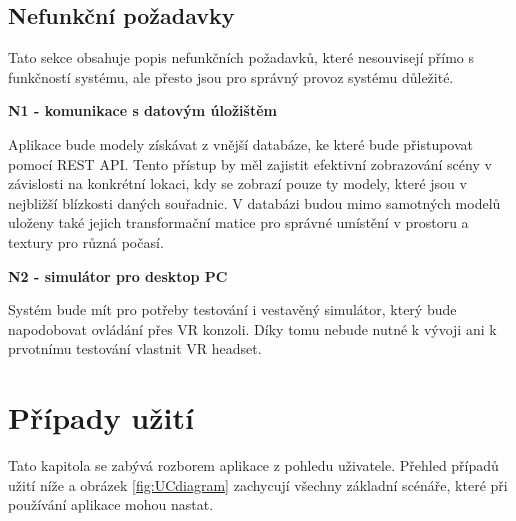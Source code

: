 \documentclass[thesis=B,czech]{FITthesis}[2012/06/26]
\begin{document}
\subsection{Nefunkční požadavky}	
	Tato sekce obsahuje popis nefunkčních požadavků, které nesouvisejí přímo s funkčností systému, ale přesto jsou pro správný provoz systému důležité.
			
 		\begin{description}
 		
 		\item \textbf{N1 - komunikace s datovým úložištěm}
 		
 		Aplikace bude modely získávat z vnější databáze, ke které bude přistupovat pomocí REST API. Tento přístup by měl zajistit efektivní zobrazování scény v závislosti na konkrétní lokaci, kdy se zobrazí pouze ty modely, které jsou v nejbližší blízkosti daných souřadnic. V databázi budou mimo samotných modelů uloženy také jejich transformační matice pro správné umístění v prostoru a textury pro různá počasí.
 		
 		\item \textbf{N2 - simulátor pro desktop PC}
 		
 		Systém bude mít pro potřeby testování i vestavěný simulátor, který bude napodobovat ovládání přes VR konzoli. Díky tomu nebude nutné k vývoji ani k prvotnímu testování vlastnit VR headset.
 		
 		
 	\end{description}	
 	
	\section{Případy užití}
	Tato kapitola se zabývá rozborem aplikace z pohledu uživatele. Přehled případů užití níže a obrázek \ref{fig:UCdiagram} zachycují všechny základní scénáře, které při používání aplikace mohou nastat.
	
\end{document}
